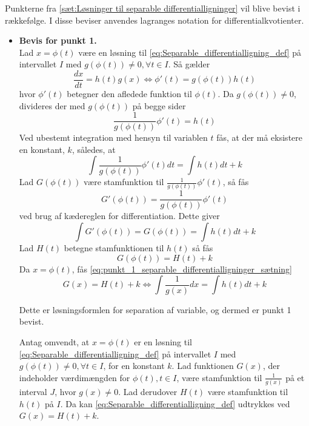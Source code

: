 \begin{bev}
    Punkterne fra \autoref{sæt:Løsninger til separable differentialligninger} vil blive bevist i rækkefølge. I disse beviser anvendes lagranges notation for differentialkvotienter.
    
    \begin{itemize}
        \item[] \textbf{Bevis for punkt 1.}\\ 
            Lad $x = \phi(t)$ være en løsning til \eqref{eq:Separable_differentialligning_def} på intervallet $I$ med $g\left(\phi(t)\right) \neq 0, \forall t\in I$. Så gælder
            $$ \frac{dx}{dt} = h(t)g(x) \Leftrightarrow \phi'(t) = g\left(\phi(t)\right) h(t) $$
            hvor $\phi'(t)$ betegner den afledede funktion til $\phi(t)$. Da $g\left(\phi(t)\right) \neq 0$, divideres der med $g\left(\phi(t)\right)$ på begge sider
            $$ \frac{1}{g\left(\phi(t)\right)} \phi'(t) = h(t) $$
            Ved ubestemt integration med hensyn til variablen $t$ fås, at der må eksistere en konstant, $k$, således, at
            $$ \int \frac{1}{g\left(\phi(t)\right)} \phi'(t) dt  = \int h(t) dt + k $$
            Lad $G(\phi(t))$ være stamfunktion til $\frac{1}{g(\phi(t))}\phi'(t)$, så fås
            $$ G'(\phi(t)) = \frac{1}{g(\phi(t))} \phi'(t) $$ 
            ved brug af kædereglen for differentiation. Dette giver
            $$ \int G'(\phi(t)) = G(\phi(t)) = \int h(t) dt + k $$
            Lad $H(t)$ betegne stamfunktionen til $h(t)$ så fås
            $$ G(\phi(t)) = H(t) + k $$
            Da $x = \phi(t)$, fås \ref{eq:punkt_1_separable_differentialligninger_sætning}
            $$ G(x) = H(t) + k \Leftrightarrow\int \frac{1}{g(x)} dx = \int h(t) dt + k $$
        
        Dette er løsningsformlen for separation af variable, og dermed er punkt 1 bevist. 

        Antag omvendt, at $x =\phi(t)$ er en løsning til \eqref{eq:Separable_differentialligning_def} på intervallet $I$ med $g\left(\phi(t)\right) \neq 0, \forall t\in I$, for en konstant $k$. Lad funktionen $G(x)$, der indeholder værdimængden for $\phi(t), t\in I$, være stamfunktion til $\frac{1}{g(x)}$ på et interval $J$, hvor $g(x)\neq 0$. Lad derudover $H(t)$ være stamfunktion til $h(t)$ på $I$. Da kan \eqref{eq:Separable_differentialligning_def} udtrykkes ved $G(x)=H(t)+k$.
        

\end{itemize}
\end{bev}
